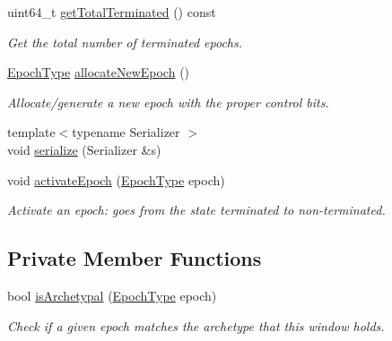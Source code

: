 \begin{DoxyCompactItemize}
uint64\+\_\+t \hyperlink{structvt_1_1epoch_1_1_epoch_window_a55dc39196c78f85094d97b61149bfcba}{get\+Total\+Terminated} () const
\begin{DoxyCompactList}\small\item\em Get the total number of terminated epochs. \end{DoxyCompactList}\item 
\hyperlink{namespacevt_a985a5adf291c34a3ca263b3378388236}{Epoch\+Type} \hyperlink{structvt_1_1epoch_1_1_epoch_window_a0c18249fdbc30c5e4ee0de6949a320a4}{allocate\+New\+Epoch} ()
\begin{DoxyCompactList}\small\item\em Allocate/generate a new epoch with the proper control bits. \end{DoxyCompactList}\item 
{\footnotesize template$<$typename Serializer $>$ }\\void \hyperlink{structvt_1_1epoch_1_1_epoch_window_a584f6dedf7cc4d28a8a153348a2f5c2c}{serialize} (Serializer \&s)
\item 
void \hyperlink{structvt_1_1epoch_1_1_epoch_window_a6efc8f11ec346d89ebbfcb36069b6e78}{activate\+Epoch} (\hyperlink{namespacevt_a985a5adf291c34a3ca263b3378388236}{Epoch\+Type} epoch)
\begin{DoxyCompactList}\small\item\em Activate an epoch\+: goes from the state terminated to non-\/terminated. \end{DoxyCompactList}\end{DoxyCompactItemize}
\subsection*{Private Member Functions}
\begin{DoxyCompactItemize}
\item 
bool \hyperlink{structvt_1_1epoch_1_1_epoch_window_a9f6b34a8ba87a8a4e6669b3b09958ba2}{is\+Archetypal} (\hyperlink{namespacevt_a985a5adf291c34a3ca263b3378388236}{Epoch\+Type} epoch)
\begin{DoxyCompactList}\small\item\em Check if a given epoch matches the archetype that this window holds. \end{DoxyCompactList}\end{DoxyCompactItemize}
